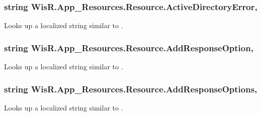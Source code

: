 \subsubsection[{Active\+Directory\+Error}]{\setlength{\rightskip}{0pt plus 5cm}string Wis\+R.\+App\+\_\+\+Resources.\+Resource.\+Active\+Directory\+Error\hspace{0.3cm}{\ttfamily [static]}, {\ttfamily [get]}}\label{class_wis_r_1_1_app___resources_1_1_resource_abf6298cbd85c0ceaabba51b2a1195207}


Looks up a localized string similar to . 

\hypertarget{class_wis_r_1_1_app___resources_1_1_resource_aa51246fef8fb4d050940748dce552d0b}{}
\subsubsection[{Add\+Response\+Option}]{\setlength{\rightskip}{0pt plus 5cm}string Wis\+R.\+App\+\_\+\+Resources.\+Resource.\+Add\+Response\+Option\hspace{0.3cm}{\ttfamily [static]}, {\ttfamily [get]}}\label{class_wis_r_1_1_app___resources_1_1_resource_aa51246fef8fb4d050940748dce552d0b}


Looks up a localized string similar to . 

\hypertarget{class_wis_r_1_1_app___resources_1_1_resource_a70474b4f447f1c3ad5c4ef4c30eb82f2}{}
\subsubsection[{Add\+Response\+Options}]{\setlength{\rightskip}{0pt plus 5cm}string Wis\+R.\+App\+\_\+\+Resources.\+Resource.\+Add\+Response\+Options\hspace{0.3cm}{\ttfamily [static]}, {\ttfamily [get]}}\label{class_wis_r_1_1_app___resources_1_1_resource_a70474b4f447f1c3ad5c4ef4c30eb82f2}


Looks up a localized string similar to . 

